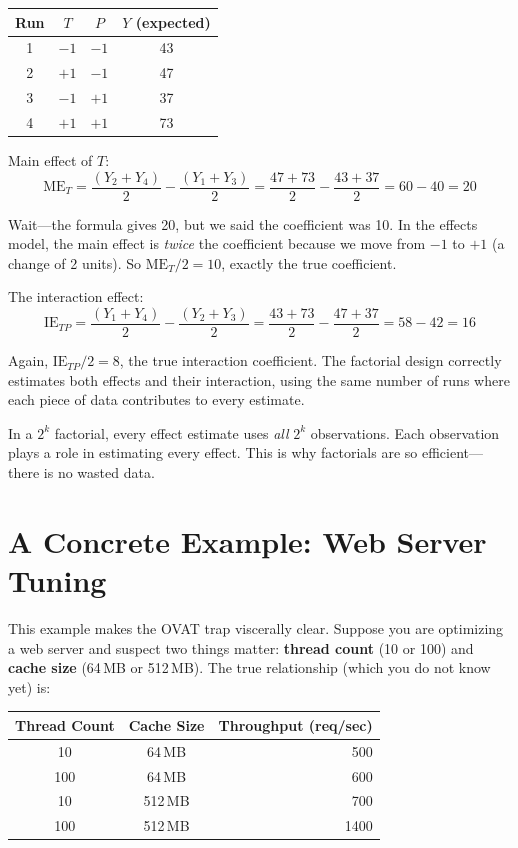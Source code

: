 \documentclass[11pt]{book}
\begin{document}
\begin{center}
\begin{tabular}{cccc}
\toprule
Run & $T$ & $P$ & $Y$ (expected) \\
\midrule
1 & $-1$ & $-1$ & 43 \\
2 & $+1$ & $-1$ & 47 \\
3 & $-1$ & $+1$ & 37 \\
4 & $+1$ & $+1$ & 73 \\
\bottomrule
\end{tabular}
\end{center}

\noindent Main effect of $T$:
\[
\text{ME}_T = \frac{(Y_2 + Y_4)}{2} - \frac{(Y_1 + Y_3)}{2}
= \frac{47 + 73}{2} - \frac{43 + 37}{2} = 60 - 40 = 20
\]

Wait---the formula gives 20, but we said the coefficient was 10. In the effects
model, the main effect is \emph{twice} the coefficient because we move from
$-1$ to $+1$ (a change of 2 units). So $\text{ME}_T / 2 = 10$, exactly the
true coefficient.

The interaction effect:
\[
\text{IE}_{TP} = \frac{(Y_1 + Y_4)}{2} - \frac{(Y_2 + Y_3)}{2}
= \frac{43 + 73}{2} - \frac{47 + 37}{2} = 58 - 42 = 16
\]

Again, $\text{IE}_{TP} / 2 = 8$, the true interaction coefficient. The factorial
design correctly estimates both effects and their interaction, using the same
number of runs where each piece of data contributes to every estimate.

\begin{keypoint}
In a $2^k$ factorial, every effect estimate uses \emph{all} $2^k$ observations.
Each observation plays a role in estimating every effect. This is why factorials
are so efficient---there is no wasted data.
\end{keypoint}

\section{A Concrete Example: Web Server Tuning}

This example makes the OVAT trap viscerally clear. Suppose you are optimizing
a web server and suspect two things matter: \textbf{thread count} (10 or 100)
and \textbf{cache size} (64\,MB or 512\,MB). The true relationship (which you
do not know yet) is:

\begin{center}
\begin{tabular}{ccr}
\toprule
Thread Count & Cache Size & Throughput (req/sec) \\
\midrule
10 & 64\,MB & 500 \\
100 & 64\,MB & 600 \\
10 & 512\,MB & 700 \\
100 & 512\,MB & 1400 \\
\bottomrule
\end{tabular}
\end{center}
\end{document}

